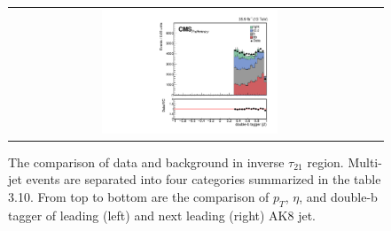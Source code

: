 \begin{figure}[t]
\begin{tabular}{cc}
    \includegraphics[width=0.5\textwidth]{Figures/dataMC_trig_antiTau21/doubleSV_j1.pdf} \\
  \end{tabular}
  \caption{The comparison of data and background in inverse $\tau _{21}$ region. Multi-jet events are separated into four categories summarized in the table 3.10. From top to bottom are the comparison of $p_{T}$, $\eta $, and double-b tagger of leading (left) and next leading (right) AK8 jet.}
  \label{fig:hvt_brs}
\end{figure}
